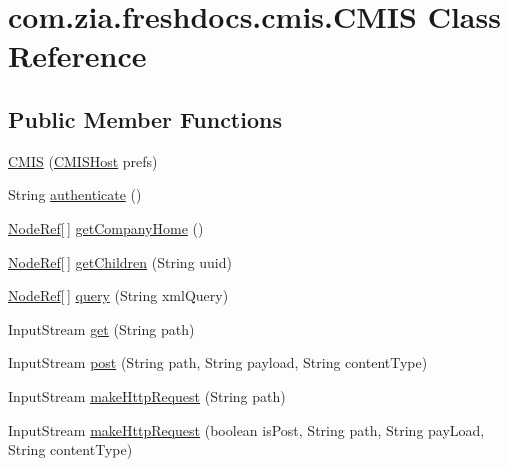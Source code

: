 \hypertarget{classcom_1_1zia_1_1freshdocs_1_1cmis_1_1_c_m_i_s}{\section{com.\-zia.\-freshdocs.\-cmis.\-C\-M\-I\-S Class Reference}
\label{classcom_1_1zia_1_1freshdocs_1_1cmis_1_1_c_m_i_s}
}
\subsection*{Public Member Functions}
\begin{DoxyCompactItemize}
\item 
\hyperlink{classcom_1_1zia_1_1freshdocs_1_1cmis_1_1_c_m_i_s_a7596e0348136523d9fb25e4cd070bce1}{C\-M\-I\-S} (\hyperlink{classcom_1_1zia_1_1freshdocs_1_1preference_1_1_c_m_i_s_host}{C\-M\-I\-S\-Host} prefs)
\item 
String \hyperlink{classcom_1_1zia_1_1freshdocs_1_1cmis_1_1_c_m_i_s_a64572bde6545d36b29c7d830099e4291}{authenticate} ()
\item 
\hyperlink{classcom_1_1zia_1_1freshdocs_1_1model_1_1_node_ref}{Node\-Ref}\mbox{[}$\,$\mbox{]} \hyperlink{classcom_1_1zia_1_1freshdocs_1_1cmis_1_1_c_m_i_s_a5219f23f9f8d1aadabbd9ccaeffad6a2}{get\-Company\-Home} ()
\item 
\hyperlink{classcom_1_1zia_1_1freshdocs_1_1model_1_1_node_ref}{Node\-Ref}\mbox{[}$\,$\mbox{]} \hyperlink{classcom_1_1zia_1_1freshdocs_1_1cmis_1_1_c_m_i_s_a4adbfb5ab408de87488d984a8e49dbb7}{get\-Children} (String uuid)
\item 
\hyperlink{classcom_1_1zia_1_1freshdocs_1_1model_1_1_node_ref}{Node\-Ref}\mbox{[}$\,$\mbox{]} \hyperlink{classcom_1_1zia_1_1freshdocs_1_1cmis_1_1_c_m_i_s_a44d1b5f259bf1aef975fef2b11eaee87}{query} (String xml\-Query)
\item 
Input\-Stream \hyperlink{classcom_1_1zia_1_1freshdocs_1_1cmis_1_1_c_m_i_s_a4789a34f03aa1a6f9286fbb27ddd3823}{get} (String path)
\item 
Input\-Stream \hyperlink{classcom_1_1zia_1_1freshdocs_1_1cmis_1_1_c_m_i_s_ae2607e491731146117733579d12e5454}{post} (String path, String payload, String content\-Type)
\item 
Input\-Stream \hyperlink{classcom_1_1zia_1_1freshdocs_1_1cmis_1_1_c_m_i_s_ae8543267fca86eee486d017ad1041b3b}{make\-Http\-Request} (String path)
\item 
Input\-Stream \hyperlink{classcom_1_1zia_1_1freshdocs_1_1cmis_1_1_c_m_i_s_a34772aab9d5714aad689d675168368d8}{make\-Http\-Request} (boolean is\-Post, String path, String pay\-Load, String content\-Type)

\end{DoxyCompactItemize}
